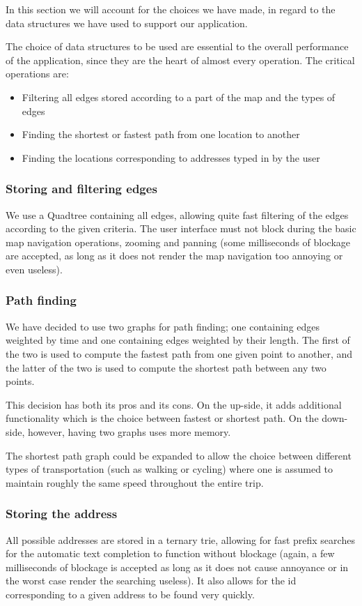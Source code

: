 In this section we will account for the choices we have made, in regard to the data structures we have used to support our application.

The choice of data structures to be used are essential to the overall performance of the application, since they are the heart of almost every operation. The critical operations are:
\begin{itemize}
	\item Filtering all edges stored according to a part of the map and the types of edges
	\item Finding the shortest or fastest path from one location to another
	\item Finding the locations corresponding to addresses typed in by the user
\end{itemize}

\subsubsection{Storing and filtering edges}
We use a Quadtree containing all edges, allowing quite fast filtering of the edges according to the given criteria. The user interface must not block during the basic map navigation operations, zooming and panning (some milliseconds of blockage are accepted, as long as it does not render the map navigation too annoying or even useless).

\subsubsection{Path finding}
We have decided to use two graphs for path finding; one containing edges weighted by time and one containing edges weighted by their length. The first of the two is used to compute the fastest path from one given point to another, and the latter of the two is used to compute the shortest path between any two points.

This decision has both its pros and its cons. On the up-side, it adds additional functionality which is the choice between fastest or shortest path. On the down-side, however, having two graphs uses more memory.

The shortest path graph could be expanded to allow the choice between different types of transportation (such as walking or cycling) where one is assumed to maintain roughly the same speed throughout the entire trip.

\subsubsection{Storing the address}
All possible addresses are stored in a ternary trie, allowing for fast prefix searches for the automatic text completion to function without blockage (again, a few milliseconds of blockage is accepted as long as it does not cause annoyance or in the worst case render the searching useless). It also allows for the id corresponding to a given address to be found very quickly.

